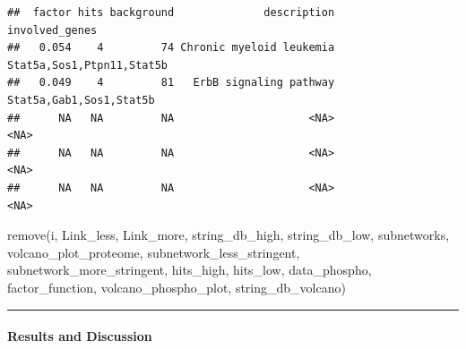 \documentclass[
]{article}
\newenvironment{Shaded}{\begin{snugshade}}{\end{snugshade}}
\newcommand{\AttributeTok}[1]{\textcolor[rgb]{0.77,0.63,0.00}{#1}}
\newcommand{\CommentTok}[1]{\textcolor[rgb]{0.56,0.35,0.01}{\textit{#1}}}
\newcommand{\FunctionTok}[1]{\textcolor[rgb]{0.00,0.00,0.00}{#1}}
\newcommand{\NormalTok}[1]{#1}
\newcommand{\OtherTok}[1]{\textcolor[rgb]{0.56,0.35,0.01}{#1}}
\newcommand{\SpecialCharTok}[1]{\textcolor[rgb]{0.00,0.00,0.00}{#1}}
\newcommand{\StringTok}[1]{\textcolor[rgb]{0.31,0.60,0.02}{#1}}
\begin{document}
\begin{Shaded}
\end{Shaded}

\begin{verbatim}
##  factor hits background              description            involved_genes
##   0.054    4         74 Chronic myeloid leukemia Stat5a,Sos1,Ptpn11,Stat5b
##   0.049    4         81   ErbB signaling pathway   Stat5a,Gab1,Sos1,Stat5b
##      NA   NA         NA                     <NA>                      <NA>
##      NA   NA         NA                     <NA>                      <NA>
##      NA   NA         NA                     <NA>                      <NA>
\end{verbatim}

\begin{Shaded}
\begin{Highlighting}[]
\FunctionTok{remove}\NormalTok{(i, Link\_less, Link\_more, string\_db\_high, string\_db\_low, subnetworks, volcano\_plot\_proteome, subnetwork\_less\_stringent, subnetwork\_more\_stringent, hits\_high, hits\_low, data\_phospho, factor\_function, volcano\_phospho\_plot, string\_db\_volcano)}
\end{Highlighting}
\end{Shaded}

\begin{center}\rule{0.5\linewidth}{0.5pt}\end{center}

\hypertarget{results-and-discussion}{%
\paragraph{Results and Discussion}\label{results-and-discussion}}
\end{document}
